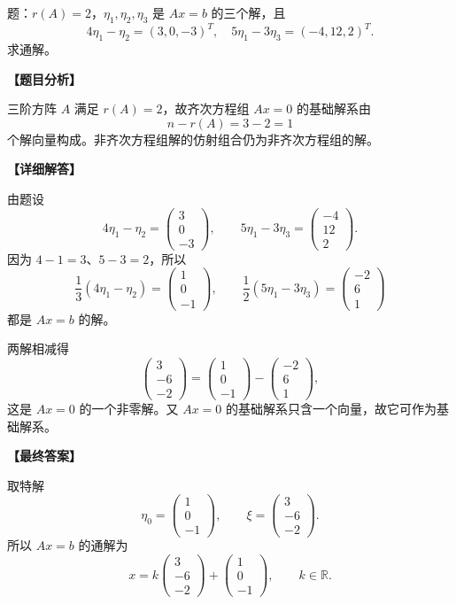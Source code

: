 ﻿\documentclass[11pt,a4paper,UTF8]{ctexart}
\begin{document}
\begin{answerbox}
题：$r(A)=2$，$\eta_1,\eta_2,\eta_3$ 是 $Ax=b$ 的三个解，且
\[4\eta_1-\eta_2=(3,0,-3)^T,\quad 5\eta_1-3\eta_3=(-4,12,2)^T.\]
求通解。

\textbf{【题目分析】}

三阶方阵 \(A\) 满足 \(r(A)=2\)，故齐次方程组 \(Ax=0\) 的基础解系由
\[
n-r(A)=3-2=1
\]
个解向量构成。非齐次方程组解的仿射组合仍为非齐次方程组的解。

\textbf{【详细解答】}

由题设
\[
4\eta_1-\eta_2=
\begin{pmatrix}3\\0\\-3\end{pmatrix},
\qquad
5\eta_1-3\eta_3=
\begin{pmatrix}-4\\12\\2\end{pmatrix}.
\]
因为 \(4-1=3\)、\(5-3=2\)，所以
\[
\frac13(4\eta_1-\eta_2)=
\begin{pmatrix}1\\0\\-1\end{pmatrix},
\qquad
\frac12(5\eta_1-3\eta_3)=
\begin{pmatrix}-2\\6\\1\end{pmatrix}
\]
都是 \(Ax=b\) 的解。

两解相减得
\[
\begin{pmatrix}3\\-6\\-2\end{pmatrix}
=
\begin{pmatrix}1\\0\\-1\end{pmatrix}
-
\begin{pmatrix}-2\\6\\1\end{pmatrix},
\]
这是 \(Ax=0\) 的一个非零解。又 \(Ax=0\) 的基础解系只含一个向量，故它可作为基础解系。

\textbf{【最终答案】}

取特解
\[
\eta_0=
\begin{pmatrix}1\\0\\-1\end{pmatrix},
\qquad
\xi=
\begin{pmatrix}3\\-6\\-2\end{pmatrix}.
\]
所以 \(Ax=b\) 的通解为
\[
x=
k\begin{pmatrix}3\\-6\\-2\end{pmatrix}
+
\begin{pmatrix}1\\0\\-1\end{pmatrix},
\qquad k\in\mathbb R.
\]


\end{answerbox}
\end{document}
